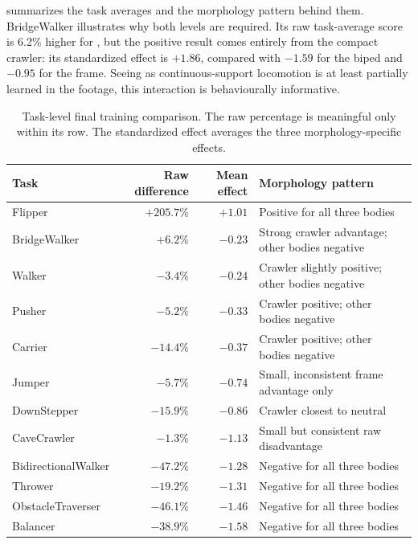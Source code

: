  summarizes the task averages and the morphology pattern behind them. BridgeWalker illustrates why both levels are required. Its raw task-average score is 6.2\% higher for \nchl{}, but the positive result comes entirely from the compact crawler: its standardized effect is $+1.86$, compared with $-1.59$ for the biped and $-0.95$ for the frame. Seeing as continuous-support locomotion is at least partially learned in the footage, this interaction is behaviourally informative. 

\begin{table}[htbp]
  \centering
  \scriptsize
  \caption{Task-level final training comparison. The raw percentage is meaningful only within its row. The standardized effect averages the three morphology-specific effects.}
  \label{tab:extended-task-effects}
  \begin{tabularx}{\textwidth}{@{}lrr>{\raggedright\arraybackslash}X@{}}
    \toprule
    Task & Raw difference & Mean effect & Morphology pattern \\
    \midrule
    Flipper & $+205.7\%$ & $+1.01$ & Positive for all three bodies \\
    BridgeWalker & $+6.2\%$ & $-0.23$ & Strong crawler advantage; other bodies negative \\
    Walker & $-3.4\%$ & $-0.24$ & Crawler slightly positive; other bodies negative \\
    Pusher & $-5.2\%$ & $-0.33$ & Crawler positive; other bodies negative \\
    Carrier & $-14.4\%$ & $-0.37$ & Crawler positive; other bodies negative \\
    Jumper & $-5.7\%$ & $-0.74$ & Small, inconsistent frame advantage only \\
    DownStepper & $-15.9\%$ & $-0.86$ & Crawler closest to neutral \\
    CaveCrawler & $-1.3\%$ & $-1.13$ & Small but consistent raw disadvantage \\
    BidirectionalWalker & $-47.2\%$ & $-1.28$ & Negative for all three bodies \\
    Thrower & $-19.2\%$ & $-1.31$ & Negative for all three bodies \\
    ObstacleTraverser & $-46.1\%$ & $-1.46$ & Negative for all three bodies \\
    Balancer & $-38.9\%$ & $-1.58$ & Negative for all three bodies \\
    \bottomrule
  \end{tabularx}
\end{table}

